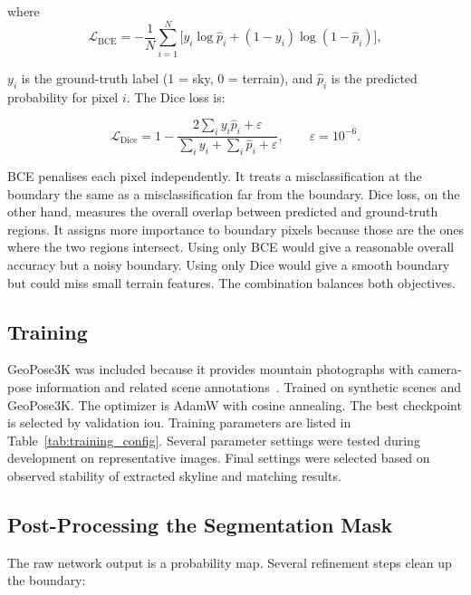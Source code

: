 \noindent where
\begin{equation}
\mathcal{L}_{\text{BCE}} = -\frac{1}{N}\sum_{i=1}^{N}\Big[y_i \log \hat{p}_i + (1-y_i)\log(1-\hat{p}_i)\Big],
\end{equation}

\noindent $y_i$ is the ground-truth label (1 = sky, 0 = terrain), and $\hat{p}_i$ is the predicted probability for pixel $i$. The Dice loss is:

\begin{equation}
\mathcal{L}_{\text{Dice}} = 1 - \frac{2\sum_i y_i\hat{p}_i + \varepsilon}{\sum_i y_i + \sum_i \hat{p}_i + \varepsilon}, \qquad \varepsilon = 10^{-6}.
\end{equation}

BCE penalises each pixel independently. It treats a misclassification at the boundary the same as a misclassification far from the boundary. Dice loss, on the other hand, measures the overall overlap between predicted and ground-truth regions. It assigns more importance to boundary pixels because those are the ones where the two regions intersect. Using only BCE would give a reasonable overall accuracy but a noisy boundary. Using only Dice would give a smooth boundary but could miss small terrain features. The combination balances both objectives.

\subsection{Training}

GeoPose3K was included because it provides mountain photographs with camera-pose information and related scene annotations~\cite{brejcha2019geopose3k}. Trained on synthetic scenes and GeoPose3K. The optimizer is AdamW with cosine annealing. The best checkpoint is selected by validation \Gls{iou}. Training parameters are listed in Table~\ref{tab:training_config}. Several parameter settings were tested during development on representative images. Final settings were selected based on observed stability of extracted skyline and matching results.



\subsection{Post-Processing the Segmentation Mask}
\label{sec:post_processing}

The raw network output is a probability map. Several refinement steps clean up the boundary:


